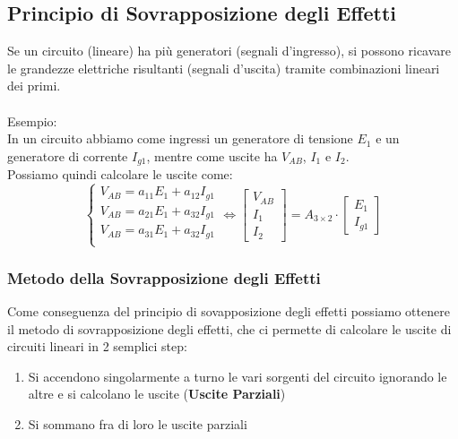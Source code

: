 \documentclass[../main.tex]{subfiles}
\begin{document}
	\subsection{Principio di Sovrapposizione degli Effetti}
	Se un circuito (lineare) ha più generatori (segnali d’ingresso), si possono ricavare le grandezze elettriche risultanti (segnali
	d’uscita) tramite combinazioni lineari dei primi.\\\\
	Esempio:\\
	In un circuito abbiamo come ingressi un generatore di tensione $E_1$ e un generatore di corrente $I_{g1}$, mentre come uscite ha $V_{AB}$, $I_1$ e $I_2$.\\
	Possiamo quindi calcolare le uscite come:
	\[\begin{cases}
		V_{AB} = a_{11} E_1 + a_{12} I_{g1}\\
		V_{AB} = a_{21} E_1 + a_{32} I_{g1}\\
		V_{AB} = a_{31} E_1 + a_{32} I_{g1}\\
	\end{cases}
	\Leftrightarrow
	\begin{bmatrix}
		V_{AB}\\
		I_1\\
		I_2
	\end{bmatrix}
	=
	A_{3 \times 2} \cdot \begin{bmatrix}
		E_1\\
		I_{g1}
	\end{bmatrix}
	\]
	\subsubsection{Metodo della Sovrapposizione degli Effetti}
	Come conseguenza del principio di sovapposizione degli effetti possiamo ottenere il metodo di sovrapposizione degli effetti, che ci permette di calcolare le uscite di circuiti lineari in 2 semplici step:
	\begin{enumerate}
		\item Si accendono singolarmente a turno le vari sorgenti del circuito ignorando le altre e si calcolano le uscite (\textbf{Uscite Parziali})
		\item Si sommano fra di loro le uscite parziali
	\end{enumerate}
\end{document}
